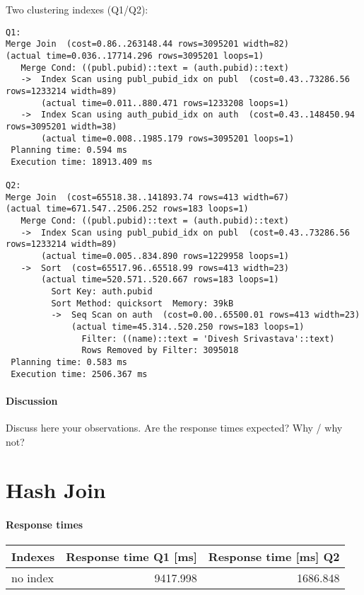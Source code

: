 \documentclass[11pt]{scrartcl}
\begin{document}
\noindent Two clustering indexes  (Q1/Q2):
{\small
\begin{verbatim}
Q1:
Merge Join  (cost=0.86..263148.44 rows=3095201 width=82)
(actual time=0.036..17714.296 rows=3095201 loops=1)
   Merge Cond: ((publ.pubid)::text = (auth.pubid)::text)
   ->  Index Scan using publ_pubid_idx on publ  (cost=0.43..73286.56 rows=1233214 width=89)
       (actual time=0.011..880.471 rows=1233208 loops=1)
   ->  Index Scan using auth_pubid_idx on auth  (cost=0.43..148450.94 rows=3095201 width=38)
       (actual time=0.008..1985.179 rows=3095201 loops=1)
 Planning time: 0.594 ms
 Execution time: 18913.409 ms

Q2:
Merge Join  (cost=65518.38..141893.74 rows=413 width=67)
(actual time=671.547..2506.252 rows=183 loops=1)
   Merge Cond: ((publ.pubid)::text = (auth.pubid)::text)
   ->  Index Scan using publ_pubid_idx on publ  (cost=0.43..73286.56 rows=1233214 width=89)
       (actual time=0.005..834.890 rows=1229958 loops=1)
   ->  Sort  (cost=65517.96..65518.99 rows=413 width=23)
       (actual time=520.571..520.667 rows=183 loops=1)
         Sort Key: auth.pubid
         Sort Method: quicksort  Memory: 39kB
         ->  Seq Scan on auth  (cost=0.00..65500.01 rows=413 width=23)
             (actual time=45.314..520.250 rows=183 loops=1)
               Filter: ((name)::text = 'Divesh Srivastava'::text)
               Rows Removed by Filter: 3095018
 Planning time: 0.583 ms
 Execution time: 2506.367 ms
\end{verbatim}
}

\paragraph{Discussion}
Discuss here your observations. Are the response times expected? Why
/ why not? 

\section{Hash Join}

\paragraph{Response times}

\begin{flushleft}
\begin{tabular}{l|r|r}
  Indexes & Response time Q1 [ms] & Response time [ms] Q2 \\
  \hline
  no index & 9417.998 & 1686.848 \\
\end{tabular}
\end{flushleft}
\end{document}
